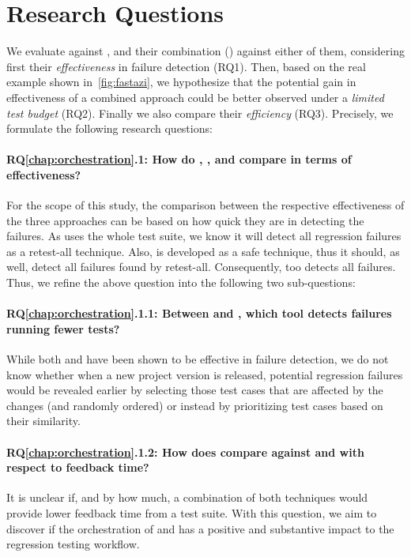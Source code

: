 \section{Research Questions}\label{sec:orch_rqs}

We evaluate \ek against \fs, and their combination (\fz) against either of them, considering first  their \textit{effectiveness} in  failure detection  (RQ1). Then, based on the real example shown in~\autoref{fig:fastazi}, we hypothesize that the potential gain in effectiveness of a combined approach could be better observed under a \textit{limited test budget} (RQ2). Finally we also compare their \textit{efficiency} (RQ3). Precisely,  we formulate the following research questions:

\paragraph{RQ\ref{chap:orchestration}.1: How do \ek, \fs, and \fz compare in terms of effectiveness?}
For the scope of this study, the comparison between the respective effectiveness of the three approaches can be based on how quick they are in detecting the failures.  As \fs uses the whole test suite, we know it will detect all regression failures as a retest-all technique.
Also, \ek is developed as a safe \tcs technique, thus it should, as well, detect all failures found by retest-all.
Consequently, \fz too detects all failures.
Thus, we refine the above question into the following two sub-questions:

\paragraph{RQ\ref{chap:orchestration}.1.1: Between \ek and \fs, which tool detects failures running fewer tests?}
While both \ek and \fs have been shown to be effective in failure  detection,  we do not  know whether when a new project version is released, potential regression failures would be revealed earlier by selecting those test cases that are affected by the changes (and randomly ordered) or instead by prioritizing test cases based on their similarity. 

\paragraph{RQ\ref{chap:orchestration}.1.2: How does \fz compare against \ek and \fs with respect to feedback time?} 
It is unclear if, and by how much, a combination of both techniques would provide lower feedback time from a test suite.
With this question, we aim to discover if the orchestration of \tcs and \tcp has a positive and substantive impact to the regression testing workflow.

